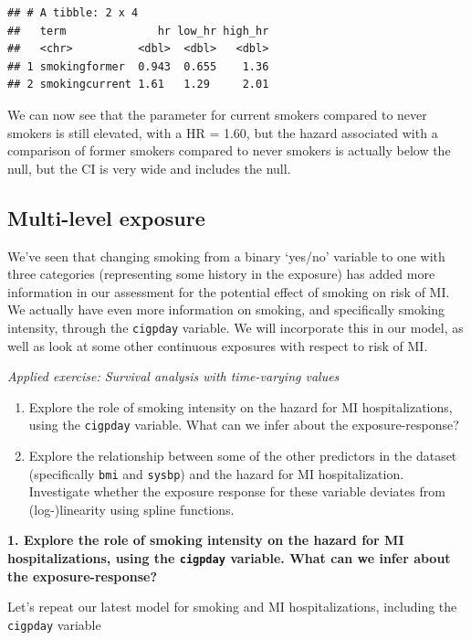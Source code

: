\documentclass[
]{book}
\providecommand{\tightlist}{%
  \setlength{\itemsep}{0pt}\setlength{\parskip}{0pt}}
\begin{document}
\begin{verbatim}
## # A tibble: 2 x 4
##   term              hr low_hr high_hr
##   <chr>          <dbl>  <dbl>   <dbl>
## 1 smokingformer  0.943  0.655    1.36
## 2 smokingcurrent 1.61   1.29     2.01
\end{verbatim}

We can now see that the parameter for current smokers compared to never smokers is still elevated, with a HR = 1.60, but the hazard associated with a comparison of former smokers compared to never smokers is actually below the null, but the CI is very wide and includes the null.

\hypertarget{multi-level-exposure}{%
\subsection{Multi-level exposure}\label{multi-level-exposure}}

We've seen that changing smoking from a binary `yes/no' variable to one with three categories (representing some history in the exposure) has added more information in our assessment for the potential effect of smoking on risk of MI. We actually have even more information on smoking, and specifically smoking intensity, through the \texttt{cigpday} variable. We will incorporate this in our model, as well as look at some other continuous exposures with respect to risk of MI.

\emph{Applied exercise: Survival analysis with time-varying values}

\begin{enumerate}
\def\labelenumi{\arabic{enumi}.}
\tightlist
\item
  Explore the role of smoking intensity on the hazard for MI hospitalizations, using the \texttt{cigpday} variable. What can we infer about the exposure-response?
\item
  Explore the relationship between some of the other predictors in the dataset (specifically \texttt{bmi} and \texttt{sysbp}) and the hazard for MI hospitalization. Investigate whether the exposure response for these variable deviates from (log-)linearity using spline functions.
\end{enumerate}

\textbf{1. Explore the role of smoking intensity on the hazard for MI hospitalizations, using the \texttt{cigpday} variable. What can we infer about the exposure-response?}

Let's repeat our latest model for smoking and MI hospitalizations, including the \texttt{cigpday} variable
\end{document}

